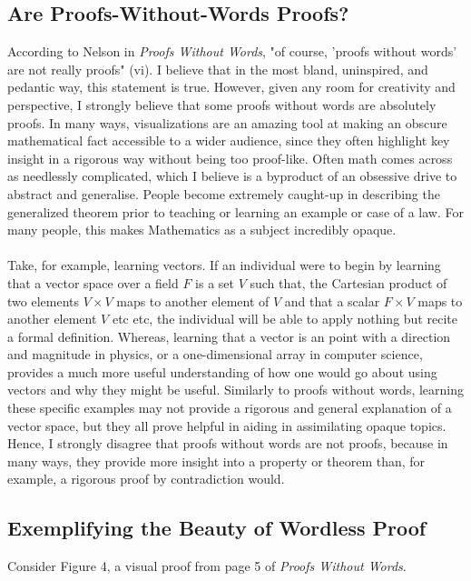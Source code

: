 \documentclass[11pt,a4paper]{article}
\begin{document}
\subsection{Are Proofs-Without-Words Proofs?}
According to Nelson in \textit{Proofs Without Words}, "of course, 'proofs without words' are not really proofs" (vi). I believe that in the most bland, uninspired, and pedantic way, this statement is true. However, given any room for creativity and perspective, I strongly believe that some proofs without words are absolutely proofs. In many ways, visualizations are an amazing tool at making an obscure mathematical fact accessible to a wider audience, since they often highlight key insight in a rigorous way without being too proof-like. Often math comes across as needlessly complicated, which I believe is a byproduct of an obsessive drive to abstract and generalise. People become extremely caught-up in describing the generalized theorem prior to teaching or learning an example or case of a law. For many people, this makes Mathematics as a subject incredibly opaque. \\ \\
	Take, for example, learning vectors. If an individual were to begin by learning that a vector space over a field $F$ is a set $V$ such that, the Cartesian product of two elements $V \times V$ maps to another element of $V$ and that a scalar $F \times V$ maps to another element $V$ etc etc, the individual will be able to apply nothing but recite a formal definition. Whereas, learning that a vector is an point with a direction and magnitude in physics, or a one-dimensional array in computer science, provides a much more useful understanding of how one would go about using vectors and why they might be useful. Similarly to proofs without words, learning these specific examples may not provide a rigorous and general explanation of a vector space, but they all prove helpful in aiding in assimilating opaque topics. Hence, I strongly disagree that proofs without words are not proofs, because in many ways, they provide more insight into a property or theorem than, for example, a rigorous proof by contradiction would.

\subsection{Exemplifying the Beauty of Wordless Proof}
Consider Figure 4, a visual proof from page 5 of \textit{Proofs Without Words}. \\
\end{document}
